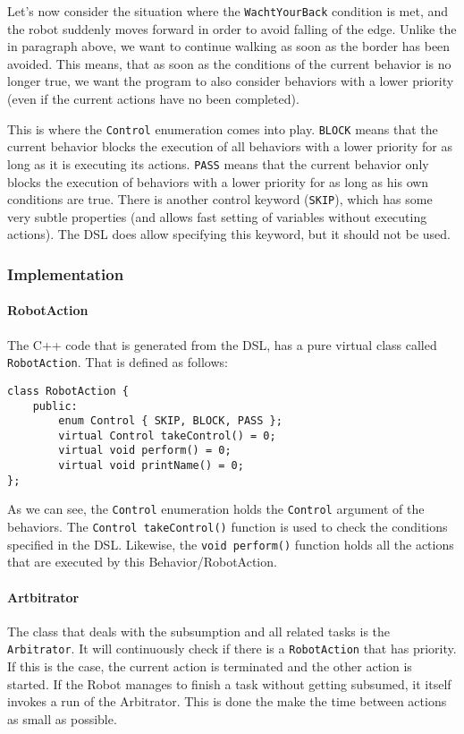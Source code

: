 \documentclass{scrartcl}
\begin{document}
Let's now consider the situation where the \texttt{WachtYourBack} condition is met, and the robot suddenly moves forward in order to avoid falling of the edge.
Unlike the in paragraph above, we want to continue walking as soon as the border has been avoided.
This means, that as soon as the conditions of the current behavior is no longer true, we want the program to also consider behaviors with a lower priority (even if the current actions have no been completed).

This is where the \texttt{Control} enumeration comes into play.
\texttt{BLOCK} means that the current behavior blocks the execution of all behaviors with a lower priority for as long as it is executing its actions.
\texttt{PASS} means that the current behavior only blocks the execution of behaviors with a lower priority for as long as his own conditions are true. There is another control keyword (\texttt{SKIP}), which has some very subtle properties (and allows fast setting of variables without executing actions).
The DSL does allow specifying this keyword, but it should not be used.

\subsubsection{Implementation}
\paragraph{RobotAction}
The C++ code that is generated from the DSL, has a pure virtual class called \texttt{RobotAction}. That is defined as follows:
\begin{verbatim}
class RobotAction {
	public:
		enum Control { SKIP, BLOCK, PASS };
		virtual Control takeControl() = 0;
		virtual void perform() = 0;
		virtual void printName() = 0;
};
\end{verbatim}
As we can see, the \texttt{Control} enumeration holds the \texttt{Control} argument of the behaviors.
The \texttt{Control takeControl()} function is used to check the conditions specified in the DSL.
Likewise, the \texttt{void perform()} function holds all the actions that are executed by this Behavior/RobotAction.

\paragraph{Artbitrator}
The class that deals with the subsumption and all related tasks is the \texttt{Arbitrator}.
It will continuously check if there is a \texttt{RobotAction} that has priority.
If this is the case, the current action is terminated and the other action is started.
If the Robot manages to finish a task without getting subsumed, it itself invokes a run of the Arbitrator.
This is done the make the time between actions as small as possible.
\end{document}
